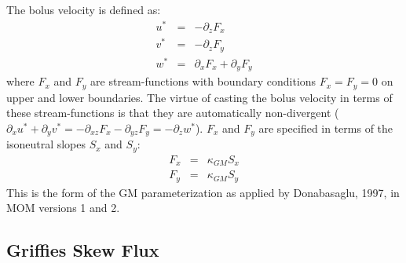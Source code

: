 The bolus velocity is defined as:
\begin{eqnarray}
u^* & = & - \partial_z F_x \\
v^* & = & - \partial_z F_y \\
w^* & = & \partial_x F_x + \partial_y F_y
\end{eqnarray}
where $F_x$ and $F_y$ are stream-functions with boundary conditions
$F_x=F_y=0$ on upper and lower boundaries. The virtue of casting the
bolus velocity in terms of these stream-functions is that they are
automatically non-divergent ($\partial_x u^* + \partial_y v^* = -
\partial_{xz} F_x - \partial_{yz} F_y = - \partial_z w^*$). $F_x$ and
$F_y$ are specified in terms of the isoneutral slopes $S_x$ and $S_y$:
\begin{eqnarray}
F_x & = & \kappa_{GM} S_x \\
F_y & = & \kappa_{GM} S_y
\end{eqnarray}
This is the form of the GM parameterization as applied by Donabasaglu,
1997, in MOM versions 1 and 2.

\subsection{Griffies Skew Flux}

